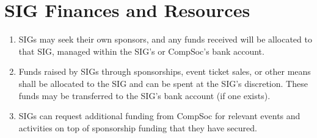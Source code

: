 \section{SIG Finances and Resources}
\begin{enumerate}
\item SIGs may seek their own sponsors, and any funds received will be allocated to that SIG, managed within the SIG’s or CompSoc’s bank account.
\item Funds raised by SIGs through sponsorships, event ticket sales, or other means shall be allocated to the SIG and can be spent at the SIG's discretion. These funds may be transferred to the SIG's bank account (if one exists).
\item SIGs can request additional funding from CompSoc for relevant events and activities
on top of sponsorship funding that they have secured.

\end{enumerate}